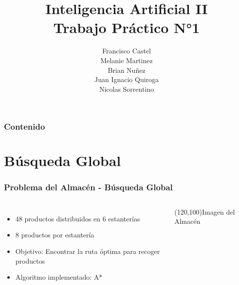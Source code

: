 \documentclass[aspectratio=169]{beamer}
\title[IA II - Trabajo Práctico N°1]{{\Huge\textbf{Inteligencia Artificial II}}\\[0.5cm]{\Large\textbf{Trabajo Práctico N°1}}}
\author{\footnotesize
    \begin{tabular}{c}
        Francisco Castel \\[0.3cm]
        Melanie Martinez \\[0.3cm]
        Brian Nuñez \\[0.3cm]
        Juan Ignacio Quiroga \\[0.3cm]
        Nicolas Sorrentino
    \end{tabular}
}
\begin{document}
\begin{frame}[plain] 
\end{frame}

\begin{frame}
    \frametitle{Contenido}
    \tableofcontents[hideallsubsections]
\end{frame}

\section{Búsqueda Global}

\begin{frame}
    \frametitle{Problema del Almacén - Búsqueda Global}
    \begin{columns}
        \begin{itemize}
            \item 48 productos distribuidos en 6 estanterías
            \item 8 productos por estantería
            \item Objetivo: Encontrar la ruta óptima para recoger productos
            \item Algoritmo implementado: A*
        \end{itemize}
        \begin{center}
            \framebox(120,100){Imagen del Almacén}
        \end{center}
    \end{columns}
\end{frame}
\end{document}
